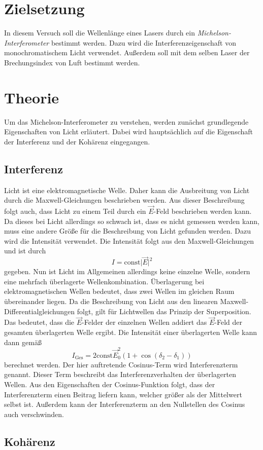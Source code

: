 \section{Zielsetzung}
\label{sec:Ziel}
In diesem Versuch soll die Wellenlänge eines Lasers durch ein \textit{Michelson-Interferometer} bestimmt werden. Dazu wird die Interferenzeigenschaft von monochromatischem 
Licht verwendet. Außerdem soll mit dem selben Laser der Brechungsindex von Luft bestimmt werden.

\section{Theorie}
\label{sec:Theorie}
Um das Michelson-Interferometer zu verstehen, werden zunächst grundlegende Eigenschaften von Licht erläutert. Dabei wird hauptsächlich auf die Eigenschaft der Interferenz und
der Kohärenz eingegangen. 
\subsection{Interferenz}
\label{subsec:Interferenz}
Licht ist eine elektromagnetische Welle. Daher kann die Ausbreitung von Licht durch die Maxwell-Gleichungen beschrieben werden. Aus dieser Beschreibung folgt auch, dass Licht
zu einem Teil durch ein $\vec{E}$-Feld beschrieben werden kann. Da dieses bei Licht allerdings so schwach ist, dass es nicht gemessen werden kann, muss eine andere Größe für die
Beschreibung von Licht gefunden werden. Dazu wird die Intensität verwendet. Die Intensität folgt aus den Maxwell-Gleichungen und ist durch 
\begin{equation*}
    I = \text{const}\lvert \vec{E} \rvert^2
\end{equation*}
gegeben. 
Nun ist Licht im Allgemeinen allerdings keine einzelne Welle, sondern eine mehrfach überlagerte Wellenkombination. Überlagerung bei elektromagnetischen Wellen bedeutet, dass 
zwei Wellen im gleichen Raum übereinander liegen. Da die Beschreibung von Licht aus den linearen Maxwell-Differentialgleichungen folgt, gilt für Lichtwellen das Prinzip der
Superposition. Das bedeutet, dass die $\vec{E}$-Felder der einzelnen Wellen addiert das $\vec{E}$-Feld der gesamten überlagerten Welle ergibt. Die Intensität einer 
überlagerten Welle kann dann gemäß 
\begin{equation}
    I_\text{Ges} = 2 \text{const}\vec{E}_0^2(1 + \cos(\delta_2 - \delta_1))
\end{equation}
berechnet werden. Der hier auftretende Cosinus-Term wird Interferenzterm genannt. Dieser Term beschreibt das Interferenzverhalten der überlagerten Wellen. Aus den Eigenschaften
der Cosinus-Funktion folgt, dass der Interferenzterm einen Beitrag liefern kann, welcher größer als der Mittelwert selbst ist. Außerdem kann der Interferenzterm an den 
Nullstellen des Cosinus auch verschwinden. 

\subsection{Kohärenz}
\label{subsec:Kohärenz}